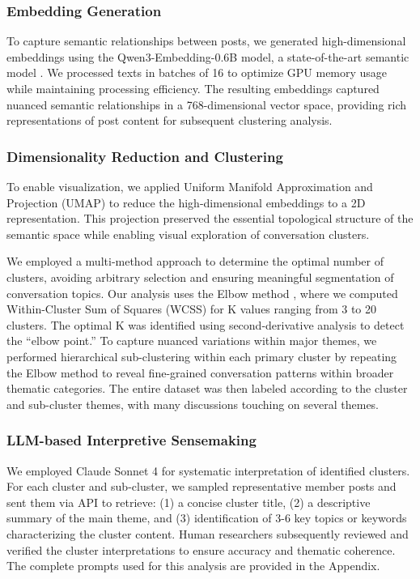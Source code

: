 \documentclass[sigconf, nonacm]{acmart}
\begin{document}
\subsubsection{Embedding Generation}
To capture semantic relationships between posts, we generated high-dimensional embeddings using the Qwen3-Embedding-0.6B model, a state-of-the-art semantic  model \citep{zhang2025qwen3}. We processed texts in batches of 16 to optimize GPU memory usage while maintaining processing efficiency. The resulting embeddings captured nuanced semantic relationships in a 768-dimensional vector space, providing rich representations of post content for subsequent clustering analysis.

\subsubsection{Dimensionality Reduction and Clustering}

To enable visualization, we applied Uniform Manifold Approximation and Projection (UMAP) to reduce the high-dimensional embeddings to a 2D representation. This projection preserved the essential topological structure of the semantic space while enabling visual exploration of conversation clusters. 

We employed a multi-method approach to determine the optimal number of clusters, avoiding arbitrary selection and ensuring meaningful segmentation of conversation topics. Our analysis uses the Elbow method \cite{cui2020introduction}, where we computed Within-Cluster Sum of Squares (WCSS) for K values ranging from 3 to 20 clusters. The optimal K was identified using second-derivative analysis to detect the ``elbow point.'' To capture nuanced variations within major themes, we performed hierarchical sub-clustering within each primary cluster by repeating the Elbow method to reveal fine-grained conversation patterns within broader thematic categories. The entire dataset was then labeled according to the cluster and sub-cluster themes, with many discussions touching on several themes. 

\subsubsection{LLM-based Interpretive Sensemaking}
We employed Claude Sonnet 4 \cite{anthropic2025claude4} for systematic interpretation of identified clusters. For each cluster and sub-cluster, we sampled representative member posts and sent them via API to retrieve: (1) a concise cluster title, (2) a descriptive summary of the main theme, and (3) identification of 3-6 key topics or keywords characterizing the cluster content. Human researchers subsequently reviewed and verified the cluster interpretations to ensure accuracy and thematic coherence. The complete prompts used for this analysis are provided in the Appendix.
\end{document}
